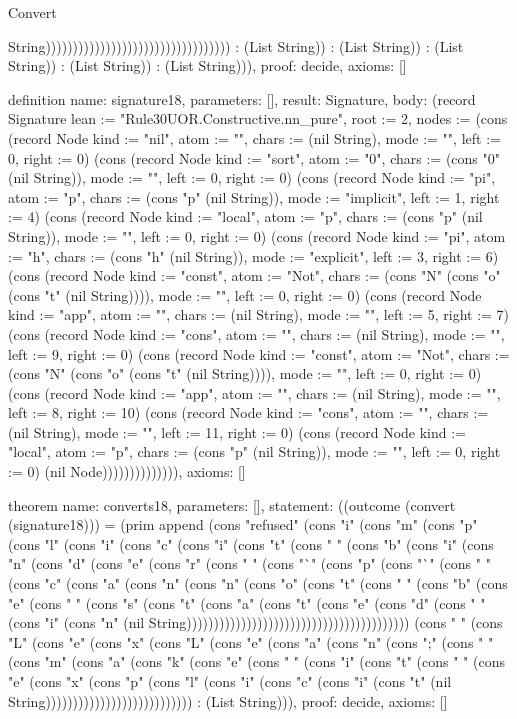 \begin{lexlean}{Convert}
\begin{semanticmodule}
{String)))))))))))))))))))))))))))))))))) : (List String)) : (List String)) : (List String)) : (List String)) : (List String))),
  proof: decide{},
  axioms: []
}

definition{
  name: signature18,
  parameters: [],
  result: Signature,
  body: (record Signature {lean := "Rule30UOR.Constructive.nn_pure", root := 2, nodes := (cons (record Node {kind := "nil", atom := "", chars := (nil String), mode := "", left := 0, right := 0}) (cons (record Node {kind := "sort", atom := "0", chars := (cons "0" (nil String)), mode := "", left := 0, right := 0}) (cons (record Node {kind := "pi", atom := "p", chars := (cons "p" (nil String)), mode := "implicit", left := 1, right := 4}) (cons (record Node {kind := "local", atom := "p", chars := (cons "p" (nil String)), mode := "", left := 0, right := 0}) (cons (record Node {kind := "pi", atom := "h", chars := (cons "h" (nil String)), mode := "explicit", left := 3, right := 6}) (cons (record Node {kind := "const", atom := "Not", chars := (cons "N" (cons "o" (cons "t" (nil String)))), mode := "", left := 0, right := 0}) (cons (record Node {kind := "app", atom := "", chars := (nil String), mode := "", left := 5, right := 7}) (cons (record Node {kind := "cons", atom := "", chars := (nil String), mode := "", left := 9, right := 0}) (cons (record Node {kind := "const", atom := "Not", chars := (cons "N" (cons "o" (cons "t" (nil String)))), mode := "", left := 0, right := 0}) (cons (record Node {kind := "app", atom := "", chars := (nil String), mode := "", left := 8, right := 10}) (cons (record Node {kind := "cons", atom := "", chars := (nil String), mode := "", left := 11, right := 0}) (cons (record Node {kind := "local", atom := "p", chars := (cons "p" (nil String)), mode := "", left := 0, right := 0}) (nil Node)))))))))))))}),
  axioms: []
}

theorem{
  name: converts18,
  parameters: [],
  statement: ((outcome (convert (signature18))) = (prim append (cons "refused" (cons "i" (cons "m" (cons "p" (cons "l" (cons "i" (cons "c" (cons "i" (cons "t" (cons " " (cons "b" (cons "i" (cons "n" (cons "d" (cons "e" (cons "r" (cons " " (cons "`" (cons "p" (cons "`" (cons " " (cons "c" (cons "a" (cons "n" (cons "n" (cons "o" (cons "t" (cons " " (cons "b" (cons "e" (cons " " (cons "s" (cons "t" (cons "a" (cons "t" (cons "e" (cons "d" (cons " " (cons "i" (cons "n" (nil String))))))))))))))))))))))))))))))))))))))))) (cons " " (cons "L" (cons "e" (cons "x" (cons "L" (cons "e" (cons "a" (cons "n" (cons ";" (cons " " (cons "m" (cons "a" (cons "k" (cons "e" (cons " " (cons "i" (cons "t" (cons " " (cons "e" (cons "x" (cons "p" (cons "l" (cons "i" (cons "c" (cons "i" (cons "t" (nil String))))))))))))))))))))))))))) : (List String))),
  proof: decide{},
  axioms: []
}


\end{semanticmodule}
\end{lexlean}
